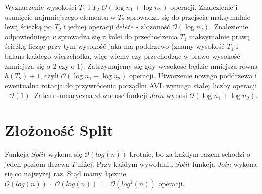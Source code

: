 \documentclass{article}
\begin{document}
Wyznaczenie wysokości $T_1$ i $T_2$ $\mathcal{O}(\log{n_1} + \log{n_2})$ operacji. Znalezienie i usunięcie najmniejszego elementu w $T_2$ sprowadza się do przejścia maksymalnie lewą ścieżką po $T_2$ i jednej operacji $delete$ - złożoność $\mathcal{O}(\log{n_2})$. Znalezienie odpowiedniego $v$ sprowadza się z kolei do przechodzenia $T_1$ maksymalnie prawą ścieżką licząc przy tym wysokość jaką ma poddrzewo (znamy wysokość $T_1$ i balans każdego wierzchołka, więc wiemy czy przechodząc w prawo wysokość zmniejsza się o 2 czy o 1). Zatrzymujemy się gdy wysokość będzie mniejsza równa $h(T_2) + 1$, czyli $\mathcal{O}(\log{n_1} - \log{n_2})$ operacji. Utworzenie nowego poddrzewa i ewentualna rotacja do przywrócenia porządku AVL wymaga stałej liczby operacji - $\mathcal{O}(1)$. Zatem sumaryczna złożoność funkcji $Join$ wynosi $\mathcal{O}(\log{n_1} + \log{n_2})$.

\section{Złożoność Split}
Funkcja $Split$ wykona się $\mathcal{O}(log(n))$-krotnie, bo za każdym razem schodzi o jeden poziom drzewa $T$ niżej. Przy każdym wywołaniu $Split$ funkcja $Join$ wykona się co najwyżej raz. Stąd mamy łącznie
$\mathcal{O}(log(n))~\cdot~\mathcal{O}(log(n))~=~\mathcal{O}(log^2(n))$ operacji.
\end{document}
